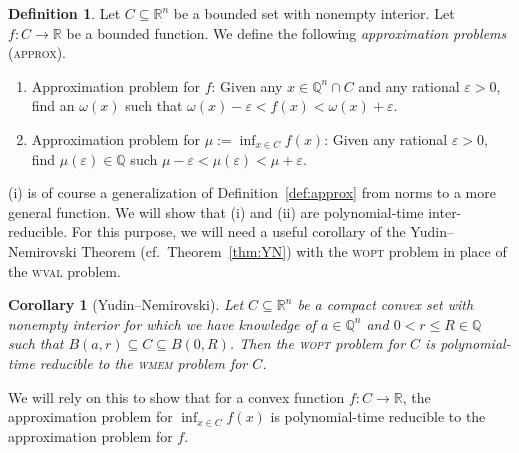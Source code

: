 \documentclass[11pt,reqno]{amsart}
\newtheorem{corollary}[theorem]{Corollary}
\theoremstyle{definition}
\newtheorem{definition}[theorem]{Definition}
\theoremstyle{remark}
\begin{document}
\begin{definition}\label{defncompfepi}  Let $C\subseteq \mathbb{R}^n$ be a bounded set with nonempty interior.  Let $f: C\to\mathbb{R}$ be a bounded function.  We define the following \emph{approximation problems} (\textsc{approx}).
\begin{enumerate}[\upshape (i)]
\item Approximation problem for $f$: Given any $x\in \mathbb{Q}^n\cap C$ and any rational $\varepsilon >0$, find an $\omega(x)$ 
such that $\omega(x)-\varepsilon< f(x)<\omega(x)+\varepsilon$.
\item  Approximation problem for $\mu:=\inf_{x\in C} f(x)$: Given any rational $\varepsilon>0$, find $\mu(\varepsilon)\in\mathbb{Q}$ such $\mu-\varepsilon<\mu(\varepsilon)<\mu+\varepsilon$. 
\end{enumerate}
\end{definition}
(i) is of course a generalization of Definition~\ref{def:approx} from norms to a more general function. We will show that (i) and (ii) are polynomial-time inter-reducible. For this purpose, we will need a useful corollary \cite[Corollary~4.3.12]{GLS88} of the Yudin--Nemirovski Theorem (cf.\ Theorem~\ref{thm:YN})
with the \textsc{wopt} problem in place of the \textsc{wval} problem.

\begin{corollary}[Yudin--Nemirovski]\label{cor:YN}
Let $C \subseteq \mathbb{R}^n$ be a compact convex set with nonempty interior for which we have knowledge of $a \in \mathbb{Q}^n$ and $0< r \le R \in \mathbb{Q}$ such that $B(a,r) \subseteq C \subseteq B(0,R)$. Then the \textsc{wopt} problem for $C$ is polynomial-time reducible to the \textsc{wmem} problem for $C$.
\end{corollary}

We will rely on this to show that for a convex function $f : C \to \mathbb{R}$, the approximation problem for $\inf_{x \in C} f(x)$ is polynomial-time reducible to the  approximation problem for $f$.
\end{document}
